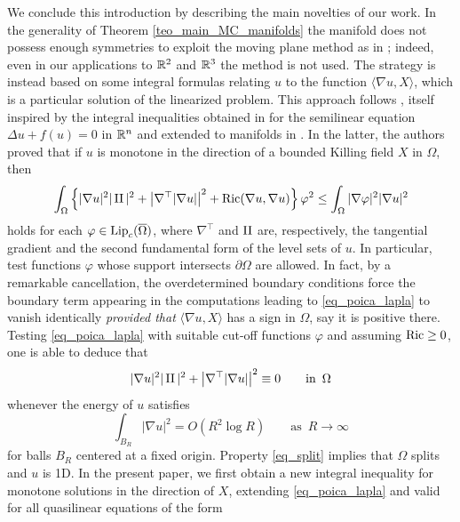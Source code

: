 \documentclass[10 pt,a4paper]{article}
\theoremstyle{definition}
\begin{document}
We conclude this introduction by describing the main novelties of our work. In the generality of Theorem \ref{teo_main_MC_manifolds} the manifold does not possess enough symmetries to exploit the moving plane method as in \cite{serrin,reichel_1,sirakov,lian_sicbaldi}; indeed, even in our applications to $\mathbb R^2$ and $\mathbb R^3$ the method is not used. The strategy is instead based on some integral formulas relating $u$ to the function $\langle\nabla u,X\rangle$, which is a particular solution of the linearized problem. This approach follows \cite{cmr}, itself inspired by the integral inequalities obtained in \cite{Arma, Arma2} for the semilinear equation $\Delta u+f(u)=0$ in $\mathbb R^n$ and extended to manifolds in \cite{FarMarVal}. In the latter, the authors proved that if $u$ is monotone in the direction of a bounded Killing field $X$ in $\Omega$, then
\begin{equation}\label{eq_poica_lapla}
\int_\Omega\left\{|\nabla u|^2 |\operatorname{II}|^2 +\left|\nabla^\top|\nabla u|\right|^2+\mathrm{Ric}(\nabla u,\nabla u)\right\}\varphi^2\le\int_\Omega|\nabla\varphi|^2|\nabla u|^2 
\end{equation}
holds for each $\varphi\in\mathrm{Lip}_c(\overline\Omega)$, where $\nabla^\top$ and $\operatorname{II}$ are, respectively, the tangential gradient and the second fundamental form of the level sets of $u$. In particular, test functions $\varphi$ whose support intersects $\partial\Omega$ are allowed. In fact, by a remarkable cancellation, the overdetermined boundary conditions force the boundary term appearing in the computations leading to \eqref{eq_poica_lapla} to vanish identically \emph{provided that} $\langle \nabla u, X \rangle$ has a sign in $\Omega$, say it is positive there. Testing \eqref{eq_poica_lapla} with suitable cut-off functions $\varphi$ and assuming $\mathrm{Ric} \ge 0$, one is able to deduce that 
\begin{equation}\label{eq_split}
|\nabla u|^2 |\operatorname{II}|^2 +\left|\nabla^\top|\nabla u|\right|^2 \equiv 0 \qquad \text{in } \, \Omega
\end{equation}
whenever the energy of $u$ satisfies 
\begin{equation}\label{eq_bounden_u}
\int_{B_R}|\nabla u|^2 = O \left( R^2 \log R \right) \qquad \text{as } \, R \to \infty 
\end{equation}
for balls $B_R$ centered at a fixed origin. Property \eqref{eq_split} implies that $\Omega$ splits and $u$ is 1D. In the present paper, we first obtain a new integral inequality for monotone solutions in the direction of $X$, extending \eqref{eq_poica_lapla} and valid for  all quasilinear equations of the form
\end{document}
